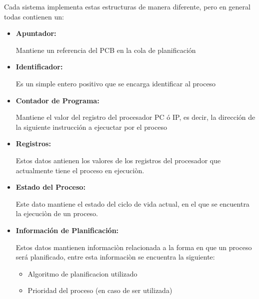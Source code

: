 \documentclass[12pt, fleqn]{report}                             %
\begin{document}
            Cada sistema implementa estas estructuras de manera diferente, pero en general
            todas contienen un:

            \begin{itemize}
                \item
                    \textbf{Apuntador:}

                    Mantiene un referencia del PCB en la cola de planificación

                \item
                    \textbf{Identificador:}

                    Es un simple entero positivo que se encarga identificar al proceso

                \item
                    \textbf{Contador de Programa:}

                    Mantiene el valor del registro del procesador PC ó IP, es decir, la dirección
                    de la siguiente instrucción a ejecuctar por el proceso

                \item
                    \textbf{Registros:}

                    Estos datos antienen los valores de los registros del procesador que actualmente
                    tiene el proceso en ejecuciòn.
                \item
                    \textbf{Estado del Proceso:}

                    Este dato mantiene el estado del ciclo de vida actual, en el que se encuentra
                    la ejecuciòn de un proceso.

                \item
                    \textbf{Información de Planificación:}

                        Estos datos mantienen informaciòn relacionada a la forma en que un proceso será
                        planificado, entre esta informaciòn se encuentra la siguiente: 

                            \begin{itemize}
                                \item Algoritmo de planificacion utilizado 
                                \item Prioridad del proceso (en caso de ser utilizada)
                            \end{itemize}


\end{itemize}
\end{document}
